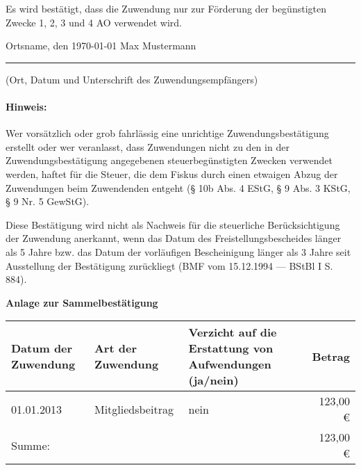 \documentclass[12pt,ngerman]{scrartcl}
\begin{document}
 
\begin{mdframed}[style=MyFormStyle]%
Es wird bestätigt, dass die Zuwendung nur zur Förderung der begünstigten Zwecke 1, 2, 3 und 4 AO verwendet wird. 
\end{mdframed} 


\vspace*{2.5em} 

Ortsname, den \today \hspace*{20em} Max Mustermann

\hrule

\vspace*{0.5em} (Ort, Datum und Unterschrift des Zuwendungsempfängers) 

\paragraph{Hinweis:} Wer vorsätzlich oder grob fahrlässig eine unrichtige Zuwendungsbestätigung erstellt oder wer veranlasst, dass 
Zuwendungen nicht zu den in der Zuwendungsbestätigung angegebenen steuerbegünstigten Zwecken verwendet 
werden, haftet für die Steuer, die dem Fiskus durch einen etwaigen Abzug der Zuwendungen beim Zuwendenden entgeht (§ 10b Abs. 4 EStG, § 9 Abs. 3 KStG, § 9 Nr. 5 GewStG). 

Diese Bestätigung wird nicht als Nachweis für die steuerliche Berücksichtigung der Zuwendung anerkannt, wenn das Datum des Freistellungsbescheides länger als 5 Jahre bzw. das Datum der vorläufigen Bescheinigung länger als 3 Jahre seit Ausstellung der Bestätigung zurückliegt (BMF vom 15.12.1994 --- BStBl I S. 884). 

\clearpage

{\bfseries\large Anlage zur Sammelbestätigung} \vspace*{2em}

\begin{tabular}{p{}p{}p{}r} \toprule
\bfseries\footnotesize Datum der Zuwendung & \bfseries\footnotesize Art der Zuwendung & \bfseries\footnotesize Verzicht auf die Erstattung von Aufwendungen (ja/nein) & \bfseries\footnotesize Betrag \\ \midrule
01.01.2013 & Mitgliedsbeitrag & nein & 123,00 \euro \\ \midrule[1pt]
Summe: & & & 123,00 \euro \\ \bottomrule[1pt]\bottomrule[1pt]
\end{tabular}
\end{document}
